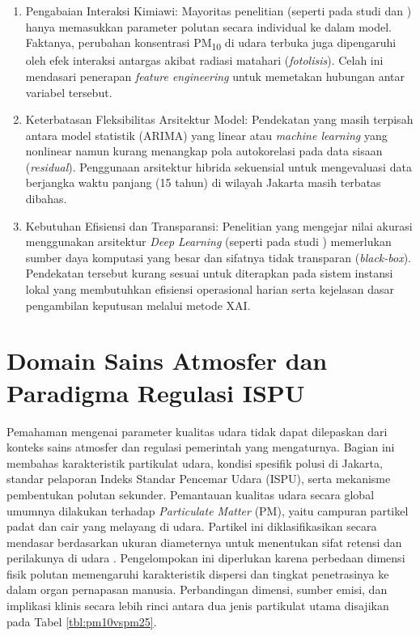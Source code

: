 \begin{enumerate}
    \item {Pengabaian Interaksi Kimiawi:} Mayoritas penelitian (seperti pada studi \autocite{alarsy2025pm25} dan \autocite{yenkikar2025explainable}) hanya memasukkan parameter polutan secara individual ke dalam model. Faktanya, perubahan konsentrasi PM\textsubscript{10} di udara terbuka juga dipengaruhi oleh efek interaksi antar\-gas akibat radiasi matahari (\textit{fotolisis}). Celah ini mendasari penerapan \textit{feature engineering} untuk memetakan hubungan antar variabel tersebut.
    \item {Keterbatasan Fleksibilitas Arsitektur Model:} Pendekatan yang masih terpisah antara model statistik (ARIMA) yang linear atau \textit{ma\-chi\-ne lear\-ning} yang non\-li\-ne\-ar namun kurang menangkap pola autokorelasi pada data sisaan (\textit{residual}). Penggunaan arsitektur hibrida sekuensial untuk mengevaluasi data berjangka waktu panjang (15 tahun) di wilayah Jakarta masih terbatas dibahas.
    \item {Kebutuhan Efisiensi dan Transparansi:} Penelitian yang mengejar nilai akurasi menggunakan arsitektur \textit{Deep Learning} (seperti pada studi \autocite{chen2025hybrid}) memerlukan sumber daya komputasi yang besar dan sifatnya tidak transparan (\textit{black-box}). Pendekatan tersebut kurang sesuai untuk diterapkan pada sistem instansi lokal yang membutuhkan efisiensi operasional harian serta kejelasan dasar pengambilan keputusan melalui metode XAI.
\end{enumerate}
\section{Domain Sains Atmosfer dan Paradigma Regulasi ISPU}

Pemahaman mengenai parameter kualitas udara tidak dapat dilepaskan dari konteks sains atmosfer dan regulasi pemerintah yang mengaturnya. Bagian ini membahas karakteristik partikulat udara, kondisi spesifik polusi di Jakarta, standar pelaporan Indeks Standar Pencemar Udara (ISPU), serta mekanisme pembentukan polutan sekunder. Pemantauan kualitas udara secara global umumnya dilakukan terhadap \textit{Particulate Matter} (PM), yaitu campuran partikel padat dan cair yang melayang di udara. Partikel ini diklasifikasikan secara mendasar berdasarkan ukuran diameternya untuk menentukan sifat retensi dan perilakunya di udara \autocite{carb2025inhalable}. Pengelompokan ini diperlukan karena perbedaan dimensi fisik polutan memengaruhi karakteristik dispersi dan tingkat penetrasinya ke dalam organ pernapasan manusia. Perbandingan dimensi, sumber emisi, dan implikasi klinis secara lebih rinci antara dua jenis partikulat utama disajikan pada Tabel \ref{tbl:pm10vspm25}.

